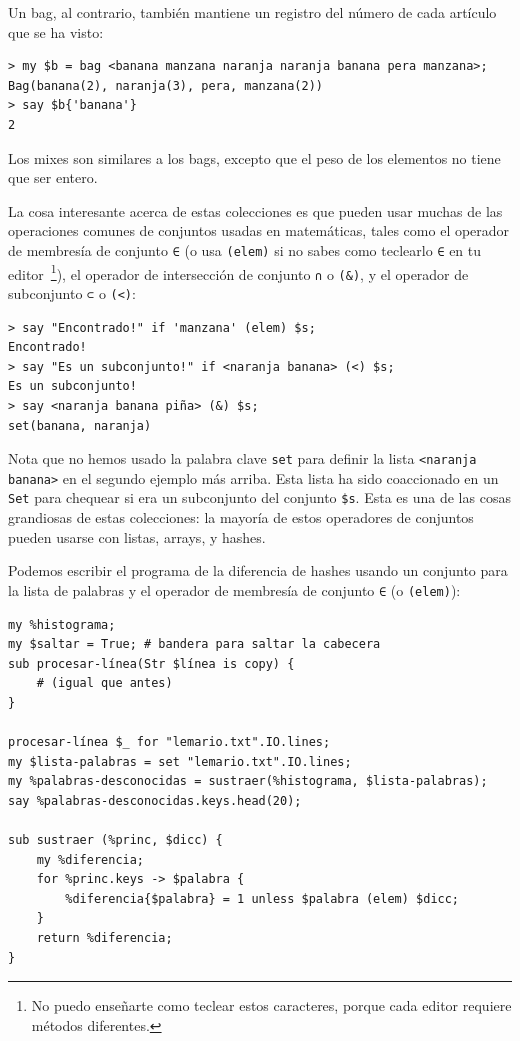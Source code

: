 Un bag, al contrario, también mantiene un registro del número de
cada artículo que se ha visto:

\begin{verbatim}
> my $b = bag <banana manzana naranja naranja banana pera manzana>;
Bag(banana(2), naranja(3), pera, manzana(2))
> say $b{'banana'}
2
\end{verbatim} 

Los mixes son similares a los bags, excepto que el peso de los elementos
no tiene que ser entero.

La cosa interesante acerca de estas colecciones es que pueden usar
muchas de las operaciones comunes de conjuntos usadas en matemáticas,
tales como el operador de membresía de conjunto \verb|∈| (o usa \verb|(elem)|
si no sabes como teclearlo \verb|∈| en tu editor~\footnote{No puedo
enseñarte como teclear estos caracteres, porque cada editor requiere
métodos diferentes.}), el operador de intersección de conjunto \verb|∩| o
\verb|(&)|, y el operador de subconjunto \verb'⊂' o \verb'(<)':

\begin{verbatim}
> say "Encontrado!" if 'manzana' (elem) $s;
Encontrado!
> say "Es un subconjunto!" if <naranja banana> (<) $s;
Es un subconjunto!
> say <naranja banana piña> (&) $s;
set(banana, naranja)
\end{verbatim}

Nota que no hemos usado la palabra clave {\tt set} para definir
la lista \verb|<naranja banana>| en el segundo ejemplo más arriba.
Esta lista ha sido coaccionado en un {\tt Set} para chequear si era
un subconjunto del conjunto \verb|$s|. Esta es una de las cosas 
grandiosas de estas colecciones: la mayoría de estos operadores de
conjuntos pueden usarse con listas, arrays, y hashes.

Podemos escribir el programa de la diferencia de hashes usando
un conjunto para la lista de palabras y el operador de membresía
de conjunto  \verb|∈| (o \verb|(elem)|):

\begin{verbatim}
my %histograma;
my $saltar = True; # bandera para saltar la cabecera
sub procesar-línea(Str $línea is copy) {
    # (igual que antes)
}

procesar-línea $_ for "lemario.txt".IO.lines; 
my $lista-palabras = set "lemario.txt".IO.lines;
my %palabras-desconocidas = sustraer(%histograma, $lista-palabras);
say %palabras-desconocidas.keys.head(20);

sub sustraer (%princ, $dicc) {
    my %diferencia;
    for %princ.keys -> $palabra {
        %diferencia{$palabra} = 1 unless $palabra (elem) $dicc;
    }
    return %diferencia;
}
\end{verbatim}

